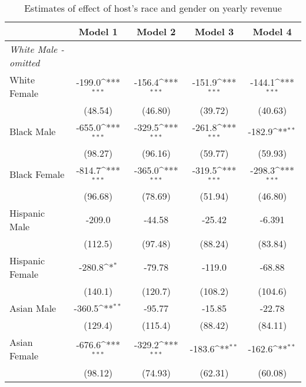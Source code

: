 {
\def\sym#1{\ifmmode^{#1}\else\(^{#1}\)\fi}
\begin{longtable}{l*{4}{c}}
\caption{Estimates of effect of host's race and gender on yearly revenue}\\
\hline\hline\endfirsthead\hline\endhead\hline\endfoot\endlastfoot
                    &\multicolumn{1}{c}{Model 1}&\multicolumn{1}{c}{Model 2}&\multicolumn{1}{c}{Model 3}&\multicolumn{1}{c}{Model 4}\\
\hline
\textit{White Male - omitted} \\
White Female        &      -199.0\sym{***}&      -156.4\sym{***}&      -151.9\sym{***}&      -144.1\sym{***}\\
                    &     (48.54)         &     (46.80)         &     (39.72)         &     (40.63)         \\
[1em]
Black Male          &      -655.0\sym{***}&      -329.5\sym{***}&      -261.8\sym{***}&      -182.9\sym{**} \\
                    &     (98.27)         &     (96.16)         &     (59.77)         &     (59.93)         \\
[1em]
Black Female        &      -814.7\sym{***}&      -365.0\sym{***}&      -319.5\sym{***}&      -298.3\sym{***}\\
                    &     (96.68)         &     (78.69)         &     (51.94)         &     (46.80)         \\
[1em]
Hispanic Male       &      -209.0         &      -44.58         &      -25.42         &      -6.391         \\
                    &     (112.5)         &     (97.48)         &     (88.24)         &     (83.84)         \\
[1em]
Hispanic Female     &      -280.8\sym{*}  &      -79.78         &      -119.0         &      -68.88         \\
                    &     (140.1)         &     (120.7)         &     (108.2)         &     (104.6)         \\
[1em]
Asian Male          &      -360.5\sym{**} &      -95.77         &      -15.85         &      -22.78         \\
                    &     (129.4)         &     (115.4)         &     (88.42)         &     (84.11)         \\
[1em]
Asian Female        &      -676.6\sym{***}&      -329.2\sym{***}&      -183.6\sym{**} &      -162.6\sym{**} \\
                    &     (98.12)         &     (74.93)         &     (62.31)         &     (60.08)         \\

\end{longtable}}
